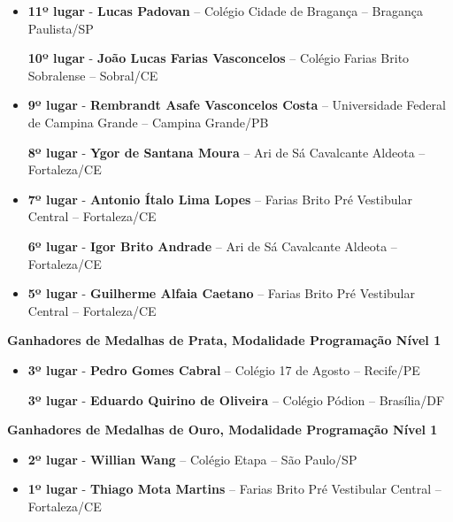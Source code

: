 \documentclass{article}
\begin{document}
\begin{itemize}
\item
\textbf{11º lugar} - \textbf{Lucas Padovan} – Colégio Cidade de Bragança – Bragança Paulista/SP


\textbf{10º lugar} - \textbf{João Lucas Farias Vasconcelos} – Colégio Farias Brito Sobralense – Sobral/CE



\item
\textbf{9º lugar} - \textbf{Rembrandt Asafe Vasconcelos Costa} – Universidade Federal de Campina Grande – Campina Grande/PB


\textbf{8º lugar} - \textbf{Ygor de Santana Moura} – Ari de Sá Cavalcante Aldeota – Fortaleza/CE



\item
\textbf{7º lugar} - \textbf{Antonio Ítalo Lima Lopes} – Farias Brito Pré Vestibular Central – Fortaleza/CE


\textbf{6º lugar} - \textbf{Igor Brito Andrade} – Ari de Sá Cavalcante Aldeota – Fortaleza/CE



\item
\textbf{5º lugar} - \textbf{Guilherme Alfaia Caetano} – Farias Brito Pré Vestibular Central – Fortaleza/CE



\end{itemize}

\textbf{\color{blue}Ganhadores de Medalhas de Prata, \color{black}Modalidade Programação Nível 1}
\color{black}

\begin{itemize}
\item
\textbf{3º lugar} - \textbf{Pedro Gomes Cabral} – Colégio 17 de Agosto – Recife/PE


\textbf{3º lugar} - \textbf{Eduardo Quirino de Oliveira} – Colégio Pódion – Brasília/DF



\end{itemize}

\textbf{\color{blue}Ganhadores de Medalhas de Ouro, \color{black}Modalidade Programação Nível 1}
\color{black}

\begin{itemize}
\item
\textbf{2º lugar} - \textbf{Willian Wang} – Colégio Etapa – São Paulo/SP



\item
\textbf{1º lugar} - \textbf{Thiago Mota Martins} – Farias Brito Pré Vestibular Central – Fortaleza/CE



\end{itemize}
\end{document}
